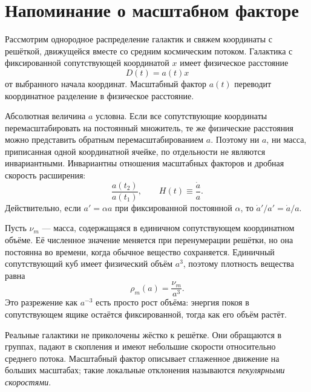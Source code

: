 \section{Напоминание о масштабном факторе}

Рассмотрим однородное распределение галактик и свяжем координаты с решёткой, движущейся вместе со средним космическим потоком. Галактика с фиксированной сопутствующей координатой \(x\) имеет физическое расстояние
\begin{equation}
D(t)=a(t)x
\label{eq:c02-distance}
\end{equation}
от выбранного начала координат. Масштабный фактор \(a(t)\) переводит координатное разделение в физическое расстояние.

Абсолютная величина \(a\) условна. Если все сопутствующие координаты перемасштабировать на постоянный множитель, те же физические расстояния можно представить обратным перемасштабированием \(a\). Поэтому ни \(a\), ни масса, приписанная одной координатной ячейке, по отдельности не являются инвариантными. Инвариантны отношения масштабных факторов и дробная скорость расширения:
\begin{equation}
\frac{a(t_2)}{a(t_1)},
\qquad
H(t)\equiv\frac{\dot a}{a}.
\label{eq:c02-hubble}
\end{equation}
Действительно, если \(a'=\alpha a\) при фиксированной постоянной \(\alpha\), то \(\dot a'/a'=\dot a/a\).

Пусть \(\nu_m\) — масса, содержащаяся в единичном сопутствующем координатном объёме. Её численное значение меняется при перенумерации решётки, но она постоянна во времени, когда обычное вещество сохраняется. Единичный сопутствующий куб имеет физический объём \(a^3\), поэтому плотность вещества равна
\begin{equation}
\boxed{\rho_m(a)=\frac{\nu_m}{a^3}.}
\label{eq:c02-matter-density}
\end{equation}
Это разрежение как \(a^{-3}\) есть просто рост объёма: энергия покоя в сопутствующем ящике остаётся фиксированной, тогда как его объём растёт.

Реальные галактики не приколочены жёстко к решётке. Они обращаются в группах, падают в скопления и имеют небольшие скорости относительно среднего потока. Масштабный фактор описывает сглаженное движение на больших масштабах; такие локальные отклонения называются \emph{пекулярными скоростями}.

\begin{classroomqa}
\end{classroomqa}

